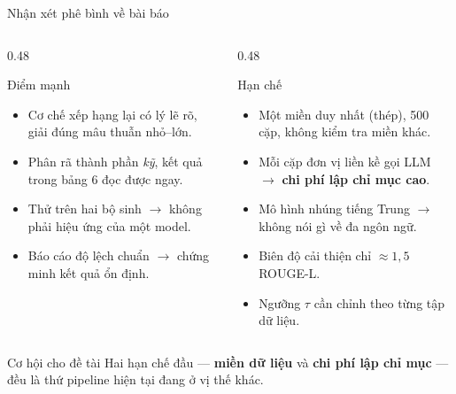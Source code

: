 \documentclass[aspectratio=169,10pt]{beamer}
\begin{document}
\begin{frame}{Nhận xét phê bình về bài báo}
  \begin{columns}[T]
    \begin{column}{0.48\textwidth}
      \begin{block}{\small Điểm mạnh}
        \begin{itemize}\footnotesize
          \item Cơ chế xếp hạng lại có lý lẽ rõ, giải đúng mâu thuẫn nhỏ--lớn.
          \item Phân rã thành phần \emph{kỹ}, kết quả trong bảng 6 đọc được ngay.
          \item Thử trên hai bộ sinh $\rightarrow$ không phải hiệu ứng của một model.
          \item Báo cáo độ lệch chuẩn $\rightarrow$ chứng minh kết quả ổn định.
        \end{itemize}
      \end{block}
    \end{column}
    \begin{column}{0.48\textwidth}
      \begin{block}{\small Hạn chế}
        \begin{itemize}\footnotesize
          \item Một miền duy nhất (thép), 500 cặp, không kiểm tra miền khác.
          \item Mỗi cặp đơn vị liền kề gọi LLM $\rightarrow$ \textbf{chi phí lập chỉ mục cao}.
          \item Mô hình nhúng tiếng Trung $\rightarrow$ không nói gì về đa ngôn ngữ.
          \item Biên độ cải thiện chỉ $\approx 1{,}5$ ROUGE-L.
          \item Ngưỡng $\tau$ cần chỉnh theo từng tập dữ liệu.
        \end{itemize}
      \end{block}
    \end{column}
  \end{columns}
  \vspace{0.4em}
  \begin{center}
    \begin{alertblock}{\small Cơ hội cho đề tài}
      \small Hai hạn chế đầu --- \textbf{miền dữ liệu} và \textbf{chi phí lập chỉ mục} ---
      đều là thứ pipeline hiện tại đang ở vị thế khác.
    \end{alertblock}
  \end{center}
\end{frame}
\end{document}
